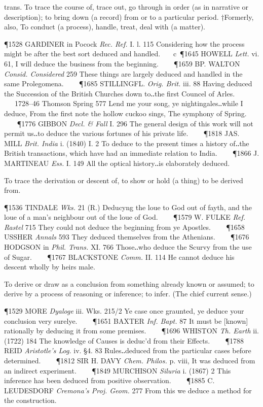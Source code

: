 \begin{description}[wide, labelwidth=!, labelindent=0pt]
\begin{myenumerate}
 trans. To trace the course of, trace out, go through in order (as in narrative or description); to bring down (a record) from or to a particular period. †Formerly, also, To conduct (a process), handle, treat, deal with (a matter).

\P 1528 GARDINER in  Pocock \textit{Rec. Ref.} I. l. 115 Considering how the process might be after the best sort deduced and handled.    c 
\P 1645 HOWELL  \textit{Lett.} vi. 61, I will deduce the business from the beginning.    
\P 1659 BP. WALTON  \textit{Consid. Considered} 259 These things are largely deduced and handled in the same Prolegomena.    
\P 1685 STILLINGFL.  \textit{Orig. Brit.} iii. 88 Having deduced the Succession of the British Churches down to‥the first Councel of Arles.    1728–46 Thomson Spring 577 Lend me your song, ye nightingales‥while I deduce, From the first note the hollow cuckoo sings, The symphony of Spring.    
\P 1776 GIBBON  \textit{Decl. \& Fall} I. 296 The general design of this work will not permit us‥to deduce the various fortunes of his private life.    
\P 1818 JAS. MILL  \textit{Brit. India} i. (1840) I. 2 To deduce to the present times a history of‥the British transactions, which have had an immediate relation to India.    
\P 1866 J. MARTINEAU  \textit{Ess.} I. 149 All the optical history‥is elaborately deduced.

 To trace the derivation or descent of, to show or hold (a thing) to be derived from.

\P 1536 TINDALE  \textit{Wks.} 21 (R.) Deducyng the loue to God out of fayth, and the loue of a man's neighbour out of the loue of God.    
\P 1579 W. FULKE  \textit{Ref. Rastel} 715 They could not deduce the beginning from ye Apostles.    
\P 1658 USSHER  \textit{Annals} 593 They deduced themselves from the Athenians.    
\P 1676 HODGSON in  \textit{Phil. Trans.} XI. 766 Those‥who deduce the Scurvy from the use of Sugar.    
\P 1767 BLACKSTONE  \textit{Comm.} II. 114 He cannot deduce his descent wholly by heirs male.

 To derive or draw as a conclusion from something already known or assumed; to derive by a process of reasoning or inference; to infer. (The chief current sense.)

\P 1529 MORE  \textit{Dyaloge} iii. Wks. 215/2 Ye case once graunted, ye deduce your conclusion very surelye.    
\P 1651 BAXTER  \textit{Inf. Bapt.} 87 It must be [known] rationally by deducing it from some premises.    
\P 1696 WHISTON  \textit{Th. Earth} ii. (1722) 184 The knowledge of Causes is deduc'd from their Effects.    
\P 1788 REID  \textit{Aristotle's Log.} iv. §4. 83 Rules‥deduced from the particular cases before determined.    
\P 1812 SIR H. DAVY  \textit{Chem. Philos.} p. viii, It was deduced from an indirect experiment.    
\P 1849 MURCHISON  \textit{Siluria} i. (1867) 2 This inference has been deduced from positive observation.    
\P 1885 C. LEUDESDORF  \textit{Cremona's Proj. Geom.} 277 From this we deduce a method for the construction.


\end{myenumerate}
\end{description}

